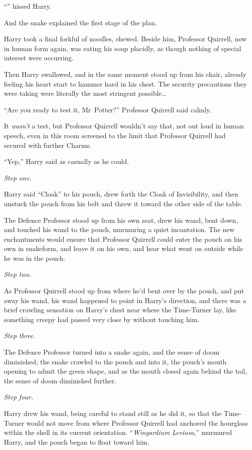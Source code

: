 “” hissed Harry.

And the snake explained the first stage of the plan.

\later

Harry took a final forkful of noodles, chewed. Beside him, Professor Quirrell, now in human form again, was eating his soup placidly, as though nothing of special interest were occurring.

Then Harry swallowed, and in the same moment stood up from his chair, already feeling his heart start to hammer hard in his chest. The security precautions they were taking were literally the most stringent possible…

“Are you ready to test it, Mr~Potter?” Professor Quirrell said calmly.

It \emph{wasn’t} a test, but Professor Quirrell wouldn’t say that, not out loud in human speech, even in this room screened to the limit that Professor Quirrell had secured with further Charms.

“Yep,” Harry said as casually as he could.

\emph{Step one.}

Harry said “Cloak” to his pouch, drew forth the Cloak of Invisibility, and then unstuck the pouch from his belt and threw it toward the other side of the table.

The Defence Professor stood up from his own seat, drew his wand, bent down, and touched his wand to the pouch, murmuring a quiet incantation. The new enchantments would ensure that Professor Quirrell could enter the pouch on his own in snakeform, and leave it on his own, and hear what went on outside while he was in the pouch.

\emph{Step two.}

As Professor Quirrell stood up from where he’d bent over by the pouch, and put away his wand, his wand happened to point in Harry’s direction, and there was a brief crawling sensation on Harry’s chest near where the Time-Turner lay, like something creepy had passed very close by without touching him.

\emph{Step three.}

The Defence Professor turned into a snake again, and the sense of doom diminished; the snake crawled to the pouch and into it, the pouch’s mouth opening to admit the green shape, and as the mouth closed again behind the tail, the sense of doom diminished further.

\emph{Step four.}

Harry drew his wand, being careful to stand still as he did it, so that the Time-Turner would not move from where Professor Quirrell had anchored the hourglass within the shell in its current orientation. “\emph{Wingardium Leviosa},” murmured Harry, and the pouch began to float toward him.

